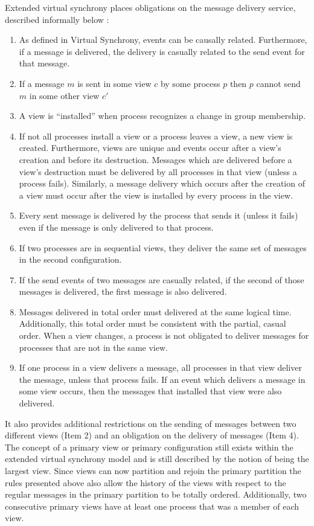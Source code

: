 Extended virtual synchrony places obligations on the message delivery service, described informally below \cite{EXTENDEDVIRTUALSYNCHRONY}:
\begin{enumerate}
	\item As defined in Virtual Synchrony, events can be causally related.
		Furthermore, if a message is delivered, the delivery is casually
		related to the send event for that message. 
	\item If a message $m$ is sent in some view $c$ by some process $p$ then $p$
		cannot send $m$ in some other view $c'$
	\item A view is ``installed'' when process recognizes a change in group membership.
	\item If not all processes install a view or a process leaves a view, a new
		view is created. Furthermore, views are unique and events occur after a
		view's creation and before its destruction. Messages which are delivered
		before a view's destruction must be delivered by all processes in that
		view (unless a process fails). Similarly, a message delivery which occurs
		after the creation of a view must occur after the view is installed by
		every process in the view.
	\item Every sent message is delivered by the process that sends it (unless it
		fails) even if the message is only delivered to that process.
	\item If two processes are in sequential views, they deliver the same set of
		messages in the second configuration.
	\item If the send events of two messages are casually related, if the
		second of those messages is delivered, the first message is also delivered.
	\item Messages delivered in total order must delivered at the same logical time.
		Additionally, this total order must be consistent with the partial, casual
		order. When a view changes, a process is not obligated to deliver messages
		for processes that are not in the same view.
	\item If one process in a view delivers a message, all processes in that view
		deliver the message, unless that process fails. If an event which delivers
		a message in some view occurs, then the messages that installed that view
		were also delivered.
\end{enumerate}

It also provides additional restrictions on the sending of messages between two different views (Item 2) and an obligation on the delivery of messages (Item 4). The concept of a primary view or primary configuration still exists within the extended virtual synchrony model and is still described by the notion of being the largest view. Since views can now partition and rejoin the primary partition the rules presented above also allow the history of the views with respect to the regular messages in the primary partition to be totally ordered. Additionally, two consecutive primary views have at least one process that was a member of each view.

